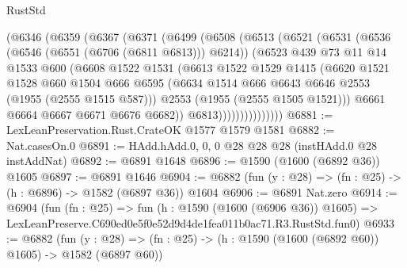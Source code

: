 \begin{lexlean}{RustStd}
\begin{coremodule}
              (@6346
                (@6359
                  (@6367
                    (@6371
                      (@6499
                        (@6508
                          (@6513
                            (@6521
                              (@6531
                                (@6536 (@6546 (@6551 (@6706 (@6811 @6813))) @6214))
                                (@6523
                                  @439
                                  @73
                                  @11
                                  @14
                                  @1533
                                  @600
                                  (@6608
                                    @1522
                                    @1531
                                    (@6613
                                      @1522
                                      @1529
                                      @1415
                                      (@6620
                                        @1521
                                        @1528
                                        @660
                                        @1504
                                        @666
                                        @6595
                                        (@6634
                                          @1514
                                          @666
                                          @6643
                                          @6646
                                          @2553
                                          (@1955 (@2555 @1515 @587)))
                                        @2553
                                        (@1955 (@2555 @1505 @1521)))
                                      @6661
                                      @6664
                                      @6667
                                      @6671
                                      @6676
                                      @6682))
                                  @6813)))))))))))))))
@6881 := LexLeanPreservation.Rust.CrateOK @1577 @1579 @1581
@6882 := Nat.casesOn.{0}
@6891 := HAdd.hAdd.{0, 0, 0} @28 @28 @28 (instHAdd.{0} @28 instAddNat)
@6892 := @6891 @1648
@6896 := @1590 (@1600 (@6892 @36)) @1605
@6897 := @6891 @1646
@6904 := @6882 (fun (y : @28) => (fn : @25) -> (h : @6896) -> @1582 (@6897 @36)) @1604
@6906 := @6891 Nat.zero
@6914 := @6904
    (fun (fn : @25) =>
    fun (h : @1590 (@1600 (@6906 @36)) @1605) =>
    LexLeanPreserve.C690ed0e5f0e52d9d4de1fea011b0ac71.R3.RustStd.fun0)
@6933 := @6882
    (fun (y : @28) => (fn : @25) -> (h : @1590 (@1600 (@6892 @60)) @1605) -> @1582 (@6897 @60))

\end{coremodule}
\end{lexlean}
